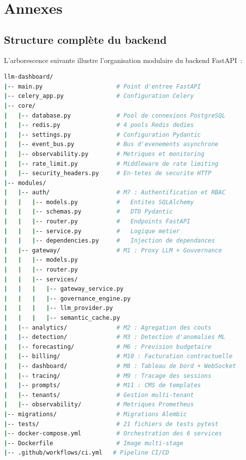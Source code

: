 
\appendix

\chapter{Annexes}

\section{Structure complète du backend}

L'arborescence suivante illustre l'organisation modulaire du backend FastAPI~:

\begin{lstlisting}[language=bash, caption={Arborescence du projet backend}]
llm-dashboard/
|-- main.py                     # Point d'entree FastAPI
|-- celery_app.py               # Configuration Celery
|-- core/
|   |-- database.py             # Pool de connexions PostgreSQL
|   |-- redis.py                # 4 pools Redis dedies
|   |-- settings.py             # Configuration Pydantic
|   |-- event_bus.py            # Bus d'evenements asynchrone
|   |-- observability.py        # Metriques et monitoring
|   |-- rate_limit.py           # Middleware de rate limiting
|   |-- security_headers.py     # En-tetes de securite HTTP
|-- modules/
|   |-- auth/                   # M7 : Authentification et RBAC
|   |   |-- models.py           #   Entites SQLAlchemy
|   |   |-- schemas.py          #   DTO Pydantic
|   |   |-- router.py           #   Endpoints FastAPI
|   |   |-- service.py          #   Logique metier
|   |   |-- dependencies.py     #   Injection de dependances
|   |-- gateway/                # M1 : Proxy LLM + Gouvernance
|   |   |-- models.py
|   |   |-- router.py
|   |   |-- services/
|   |   |   |-- gateway_service.py
|   |   |   |-- governance_engine.py
|   |   |   |-- llm_provider.py
|   |   |   |-- semantic_cache.py
|   |-- analytics/              # M2 : Agregation des couts
|   |-- detection/              # M3 : Detection d'anomalies ML
|   |-- forecasting/            # M6 : Prevision budgetaire
|   |-- billing/                # M10 : Facturation contractuelle
|   |-- dashboard/              # M8 : Tableau de bord + WebSocket
|   |-- tracing/                # M9 : Tracage des sessions
|   |-- prompts/                # M11 : CMS de templates
|   |-- tenants/                # Gestion multi-tenant
|   |-- observability/          # Metriques Prometheus
|-- migrations/                 # Migrations Alembic
|-- tests/                      # 21 fichiers de tests pytest
|-- docker-compose.yml          # Orchestration des 6 services
|-- Dockerfile                  # Image multi-stage
|-- .github/workflows/ci.yml   # Pipeline CI/CD
\end{lstlisting}


